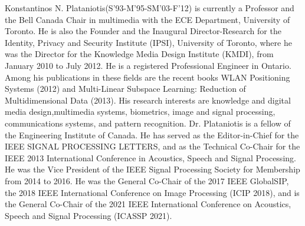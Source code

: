 \documentclass{ieeeaccess}
\begin{document}
%
\begin{IEEEbiography}{Konstantinos N.  Plataniotis}(S'93-M'95-SM'03-F'12)  is currently a Professor and the Bell Canada Chair in multimedia with the ECE Department, University of Toronto. He is also the Founder and the Inaugural Director-Research for the Identity, Privacy and Security Institute (IPSI), University of Toronto, where he was the Director for the Knowledge Media
Design Institute (KMDI), from January 2010 to July 2012. He is a registered Professional Engineer in Ontario. Among his publications in these fields are the recent books WLAN Positioning Systems (2012) and Multi-Linear Subspace Learning: Reduction of Multidimensional Data (2013). His research interests are knowledge and digital media design,multimedia systems, biometrics, image and signal processing, communications systems, and pattern recognition. Dr. Plataniotis is a fellow of the Engineering Institute of Canada. He has
served as the Editor-in-Chief for the IEEE SIGNAL PROCESSING LETTERS, and as the Technical Co-Chair for the IEEE 2013 International Conference in Acoustics, Speech and Signal Processing. He was the Vice President of the IEEE Signal Processing Society for Membership from 2014 to 2016. He was the General Co-Chair of the 2017 IEEE GlobalSIP, the 2018 IEEE International Conference on Image Processing (ICIP 2018), and is the General Co-Chair of the 2021 IEEE International Conference on Acoustics, Speech and Signal Processing (ICASSP 2021).
\end{IEEEbiography}

\EOD
\end{document}
